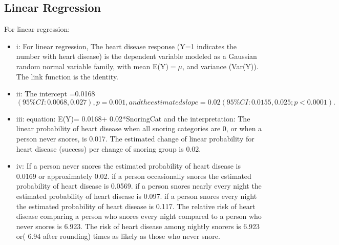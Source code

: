 \documentclass{article}
\begin{document}
 \subsection{Linear Regression}
 For linear regression: 
 \begin{itemize}
     \item i: For linear regression, The heart disease response (Y=1 indicates the number with heart disease) is the dependent variable modeled as a Gaussian random normal variable family, with mean E(Y)$=\mu$, and variance (Var(Y)).  The link function is the identity.  \item ii: The intercept =0.0168 $(95\%CI: 0.0068, 0.027), p=0.001, and the estimated slope= 0.02 (95\% CI : 0.0155,0.025; p<0.0001).$
     \item iii: equation: E(Y)= 0.0168+ 0.02*SnoringCat
 and the interpretation: The linear probability of heart disease when all snoring categories are 0, or when a person never snores, is 0.017.  The estimated change of linear probability for heart disease (success) per change of snoring group is 0.02.
 \item iv:  If a person never snores the estimated probability of heart disease is 0.0169 or approximately 0.02.
 if a person occasionally snores the estimated probability of heart disease is 0.0569.
 if a person snores nearly every night the estimated probability of heart disease is 0.097.
 if a person snores every night the estimated probability of heart disease is 0.117.
 The relative risk of heart disease comparing a person who snores every night compared to a person who never snores is 6.923.  The risk of heart disease among nightly snorers is 6.923 or( 6.94 after rounding) times as likely as those who never snore.
 \end{itemize}
\end{document}

